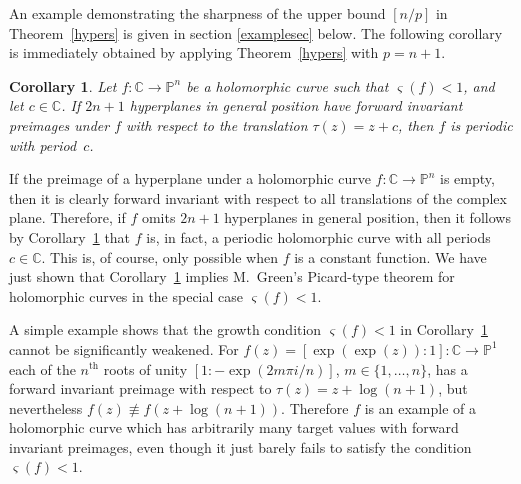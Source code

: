 \documentclass{amsart}
\newcommand{\C}{\mathbb{C}}
\renewcommand{\P}{\mathbb{P}}
\newtheorem{corollary}[theorem]{Corollary}
\theoremstyle{definition}
\numberwithin{equation}{section}
\numberwithin{theorem}{section}
\begin{document}
An example demonstrating the sharpness of the upper bound $[n/p]$ in Theorem~\ref{hypers} is given in section \ref{examplesec} below.
The following corollary is immediately obtained by applying Theorem~\ref{hypers}
with $p=n+1$.

\begin{corollary}\label{hyperscor}
Let $f:\C\to\P^n$ be a holomorphic curve such that
$\varsigma(f)<1$, and let $c\in\C$. If $2n+1$ hyperplanes in general position have forward invariant preimages under $f$ with respect to
the translation $\tau(z)= z+c$, then $f$ is periodic with
period~$c$.
\end{corollary}

If the preimage of a hyperplane under a holomorphic curve
$f:\C\to\P^n$ is empty, then it is clearly forward invariant with
respect to all translations of the complex plane. Therefore, if
$f$ omits $2n+1$ hyperplanes in general position, then it follows
by Corollary~\ref{hyperscor} that $f$ is, in fact, a periodic
holomorphic curve with all periods $c\in\C$. This is, of course,
only possible when $f$ is a constant function. We have just shown
that Corollary~\ref{hyperscor} implies M.~Green's Picard-type
theorem for holomorphic curves \cite{green:72} in the special case
$\varsigma(f)<1$.

A simple example shows that the growth condition $\varsigma(f)<1$
in Corollary~\ref{hyperscor} cannot
be significantly weakened. For $f(z)=[\exp(\exp(z)):1]:\C\to\P^1$
each of the $n^{\textrm{th}}$ roots of unity $[1:-\exp(2 m\pi
i/n)]$, $m\in\{1,\ldots,n\}$, has a forward invariant preimage
with respect to $\tau(z)= z+\log(n+1)$, but nevertheless
$f(z)\not\equiv f(z+\log(n+1))$. Therefore $f$ is an example of a
holomorphic curve which has arbitrarily many target values with
forward invariant preimages, even though it just barely fails to
satisfy the condition $\varsigma(f)<1$.
\end{document}
